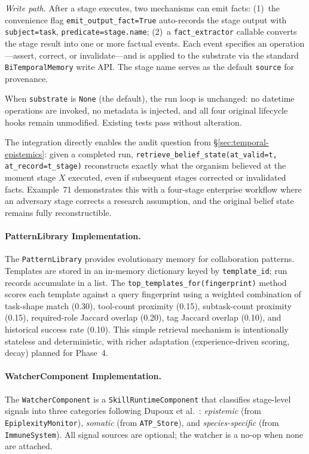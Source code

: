 \noindent\textit{Write path.}
After a stage executes, two mechanisms can emit facts: (1)~the convenience flag \texttt{emit\_output\_fact=True} auto-records the stage output with \texttt{subject=task}, \texttt{predicate=stage.name}; (2)~a \texttt{fact\_extractor} callable converts the stage result into one or more factual events. Each event specifies an operation---assert, correct, or invalidate---and is applied to the substrate via the standard \texttt{BiTemporalMemory} write API. The stage name serves as the default \texttt{source} for provenance.

When \texttt{substrate} is \texttt{None} (the default), the run loop is unchanged: no datetime operations are invoked, no metadata is injected, and all four original lifecycle hooks remain unmodified. Existing tests pass without alteration.

The integration directly enables the audit question from \S\ref{sec:temporal-epistemics}: given a completed run, \texttt{retrieve\_belief\_state(at\_valid=t, at\_record=t\_stage)} reconstructs exactly what the organism believed at the moment stage $X$ executed, even if subsequent stages corrected or invalidated facts. Example~71 demonstrates this with a four-stage enterprise workflow where an adversary stage corrects a research assumption, and the original belief state remains fully reconstructible.

\paragraph{PatternLibrary Implementation.}
\label{sec:pattern-library-impl}
The \texttt{PatternLibrary} provides evolutionary memory for collaboration patterns. Templates are stored in an in-memory dictionary keyed by \texttt{template\_id}; run records accumulate in a list. The \texttt{top\_templates\_for(fingerprint)} method scores each template against a query fingerprint using a weighted combination of task-shape match (0.30), tool-count proximity (0.15), subtask-count proximity (0.15), required-role Jaccard overlap (0.20), tag Jaccard overlap (0.10), and historical success rate (0.10). This simple retrieval mechanism is intentionally stateless and deterministic, with richer adaptation (experience-driven scoring, decay) planned for Phase~4.

\paragraph{WatcherComponent Implementation.}
\label{sec:watcher-impl}
The \texttt{WatcherComponent} is a \texttt{SkillRuntimeComponent} that classifies stage-level signals into three categories following Dupoux et al.~\cite{dupoux2026learning}: \emph{epistemic} (from \texttt{EpiplexityMonitor}), \emph{somatic} (from \texttt{ATP\_Store}), and \emph{species-specific} (from \texttt{ImmuneSystem}). All signal sources are optional; the watcher is a no-op when none are attached.

